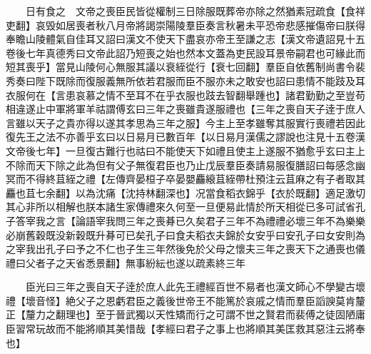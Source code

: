 　　日有食之　文帝之喪臣民皆從權制三日除服既葬帝亦除之然猶素冠疏食【食祥吏翻】哀毁如居喪者秋八月帝將謁崇陽陵羣臣奏言秋暑未平恐帝悲感摧傷帝曰朕得奉瞻山陵體氣自佳耳又詔曰漢文不使天下盡哀亦帝王至謙之志【漢文帝遺詔見十五卷後七年真德秀曰文帝此詔乃短喪之始也然本文蓋為吏民設耳景帝嗣君也可緣此而短其喪乎】當見山陵何心無服其議以衰絰從行【衰七回翻】羣臣自依舊制尚書令裴秀奏曰陛下既除而復服義無所依若君服而臣不服亦未之敢安也詔曰患情不能跂及耳衣服何在【言患哀慕之情不至耳不在乎衣服也跂去智翻舉踵也】諸君勤勤之至豈苟相違遂止中軍將軍羊祜謂傅玄曰三年之喪雖貴遂服禮也【三年之喪自天子逹于庶人言雖以天子之貴亦得以遂其孝思為三年之服】今主上至孝雖奪其服實行喪禮若因此復先王之法不亦善乎玄曰以日易月已數百年【以日易月漢儒之謬說也注見十五卷漢文帝後七年】一旦復古難行也祜曰不能使天下如禮且使主上遂服不猶愈乎玄曰主上不除而天下除之此為但有父子無復君臣也乃止戊辰羣臣奏請易服復膳詔曰每感念幽冥而不得終苴絰之禮【左傳齊晏桓子卒晏嬰麤縗苴絰帶杜預注云苴麻之有子者取其麤也苴七余翻】以為沈痛【沈持林翻深也】况當食稻衣錦乎【衣於既翻】適足激切其心非所以相解也朕本諸生家傳禮來久何至一旦便易此情於所天相從已多可試省孔子答宰我之言【論語宰我問三年之喪朞已久矣君子三年不為禮禮必壞三年不為樂樂必崩舊穀既没新穀既升朞可已矣孔子曰食夫稻衣夫錦於女安乎曰安孔子曰女安則為之宰我出孔子曰予之不仁也子生三年然後免於父母之懷夫三年之喪天下之通喪也儀禮曰父者子之天省悉景翻】無事紛紜也遂以疏素終三年

　　臣光曰三年之喪自天子逹於庶人此先王禮經百世不易者也漢文師心不學變古壞禮【壞音怪】絶父子之恩虧君臣之義後世帝王不能篤於哀戚之情而羣臣謟諛莫肯釐正【釐力之翻理也】至于晉武獨以天性矯而行之可謂不世之賢君而裴傅之徒固陋庸臣習常玩故而不能將順其美惜哉【孝經曰君子之事上也將順其美匡救其惡注云將奉也】

